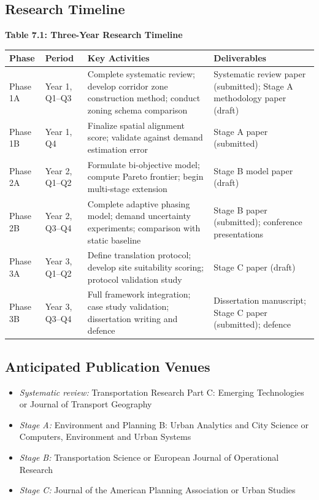 \documentclass[12pt,letterpaper]{article}
\begin{document}
\subsection{Research Timeline}

\smallskip
\noindent\textbf{Table 7.1: Three-Year Research Timeline}

\smallskip
\begin{tabularx}{\textwidth}{@{}llXX@{}}
  \toprule
  \textbf{Phase} & \textbf{Period} & \textbf{Key Activities} &
  \textbf{Deliverables} \\
  \midrule
  Phase 1A & Year 1, Q1--Q3 &
    Complete systematic review; develop corridor zone construction method;
    conduct zoning schema comparison &
    Systematic review paper (submitted); Stage A methodology paper (draft) \\
  Phase 1B & Year 1, Q4 &
    Finalize spatial alignment score; validate against demand estimation error &
    Stage A paper (submitted) \\
  Phase 2A & Year 2, Q1--Q2 &
    Formulate bi-objective model; compute Pareto frontier; begin multi-stage extension &
    Stage B model paper (draft) \\
  Phase 2B & Year 2, Q3--Q4 &
    Complete adaptive phasing model; demand uncertainty experiments;
    comparison with static baseline &
    Stage B paper (submitted); conference presentations \\
  Phase 3A & Year 3, Q1--Q2 &
    Define translation protocol; develop site suitability scoring;
    protocol validation study &
    Stage C paper (draft) \\
  Phase 3B & Year 3, Q3--Q4 &
    Full framework integration; case study validation;
    dissertation writing and defence &
    Dissertation manuscript; Stage C paper (submitted); defence \\
  \bottomrule
\end{tabularx}

\subsection{Anticipated Publication Venues}

\begin{itemize}[noitemsep]
  \item \textit{Systematic review:} Transportation Research Part C:
    Emerging Technologies or Journal of Transport Geography
  \item \textit{Stage A:} Environment and Planning B: Urban Analytics
    and City Science or Computers, Environment and Urban Systems
  \item \textit{Stage B:} Transportation Science or European Journal of
    Operational Research
  \item \textit{Stage C:} Journal of the American Planning Association
    or Urban Studies
\end{itemize}
\end{document}
